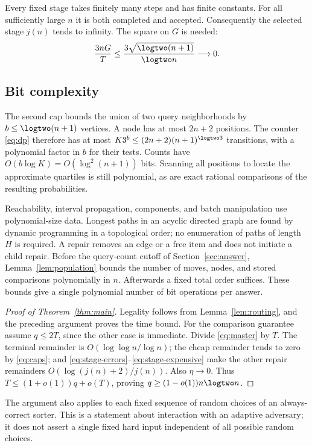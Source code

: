 Every fixed stage takes finitely many steps and has finite constants.
For all sufficiently large $n$ it is both completed and accepted.
Consequently the selected stage $j(n)$ tends to infinity.
The square on $G$ is needed:
\[
               \frac{3nG}{T}
               \leq\frac{3\sqrt{\logtwo(n+1)}}{\logtwo n}
               \longrightarrow0.
\]

\subsection{Bit complexity}

The second cap bounds the union of two query neighborhoods by
$b\leq\logtwo(n+1)$ vertices. A node has at most $2n+2$ positions.
The counter \eqref{eq:dp} therefore has at most
$K3^b\leq(2n+2)(n+1)^{\logtwo3}$ transitions, with a polynomial factor
in $b$ for their tests. Counts have $O(b\log K)=O(\log^2(n+1))$
bits. Scanning all positions to locate the approximate quartiles is still
polynomial, as are exact rational comparisons of the resulting probabilities.

Reachability, interval propagation, components, and batch manipulation use
polynomial-size data. Longest paths in an acyclic directed graph are found
by dynamic programming in a topological order; no enumeration of paths of
length $H$ is required. A repair removes an edge or a free item and does
not initiate a child repair. Before the query-count cutoff of
Section~\ref{sec:answer}, Lemma~\ref{lem:population} bounds the number of
moves, nodes, and stored comparisons polynomially in $n$. Afterwards a
fixed total order suffices. These bounds give a single polynomial number
of bit operations per answer.

\begin{proof}[Proof of Theorem~\ref{thm:main}]
Legality follows from Lemma~\ref{lem:routing}, and the preceding argument
proves the time bound. For the comparison guarantee assume $q\leq2T$,
since the other case is immediate. Divide \eqref{eq:master} by $T$.
The terminal remainder is $O(\log\log n/\log n)$; the cheap remainder
tends to zero by \eqref{eq:caps}; and
\eqref{eq:stage-errors}--\eqref{eq:stage-expensive} make the other repair
remainders $O(\log(j(n)+2)/j(n))$. Also $\eta\to0$.
Thus $T\leq(1+o(1))q+o(T)$, proving $q\geq(1-o(1))n\logtwo n$.
\end{proof}

The argument also applies to each fixed sequence of random choices of an
always-correct sorter. This is a statement about interaction with an
adaptive adversary; it does not assert a single fixed hard input
independent of all possible random choices.
